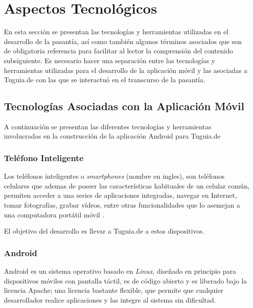 \section{Aspectos Tecnológicos} \label{sect:aspectos_tecnologicos}

En esta sección se presentan las tecnologías y herramientas utilizadas en el desarrollo de la pasantía, así como también algunos términos asociados que son de obligatoria referencia para facilitar al lector la comprensión del contenido subsiguiente. Es necesario hacer una separación entre las tecnologías y herramientas utilizadas para el desarrollo de la aplicación móvil y las asociadas a Tuguia.de con las que se interactuó en el transcurso de la pasantía.

\subsection{Tecnologías Asociadas con la Aplicación Móvil} \label{subsect:Asociadas_movil}

A continuación se presentan las diferentes tecnologías y herramientas involucradas en la construcción de la aplicación Android para Tuguia.de 

\subsubsection{Teléfono Inteligente}

Los teléfonos inteligentes o \textit{smartphones} (nombre en ingles), son teléfonos celulares que ademas de poseer las características habituales de un celular común, permiten acceder a una series de aplicaciones integradas, navegar en Internet, tomar fotografías, grabar vídeos, entre otras funcionalidades que lo asemejan  a una computadora portátil móvil \cite{PCM}.

El objetivo del desarrollo es llevar a Tuguia.de a estos dispositivos.

\subsubsection{Android}

Android es un sistema operativo basado en \textit{Linux}, diseñado en principio para dispositivos móviles con pantalla táctil, es de código abierto y es liberado bajo la licencia Apache; una licencia bastante flexible, que permite que cualquier desarrollador realice aplicaciones y las integre al sistema sin dificultad.

